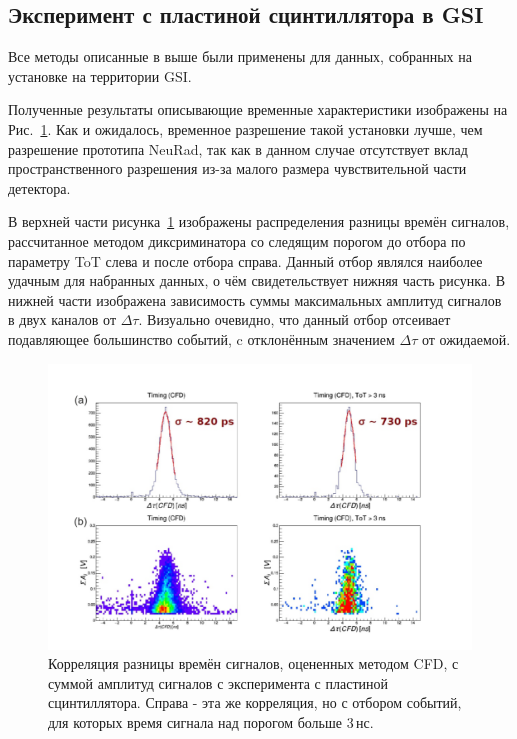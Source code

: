 \subsection{Эксперимент с пластиной сцинтиллятора в GSI}

Все методы описанные в выше были применены для данных, собранных на установке на территории GSI.

Полученные результаты описывающие временные характеристики изображены на Рис.~\ref{ris:GSIcfd_amp}. Как и ожидалось, временное разрешение такой установки лучше, чем разрешение прототипа NeuRad, так как в данном случае отсутствует вклад пространственного разрешения из-за малого размера чувствительной части детектора.

В верхней части рисунка~\ref{ris:GSIcfd_amp} изображены распределения разницы времён сигналов, рассчитанное методом диксриминатора со следящим порогом до отбора по параметру ToT слева и после отбора справа. Данный отбор являлся наиболее удачным для набранных данных, о чём свидетельствует нижняя часть рисунка. В нижней части изображена зависимость суммы максимальных амплитуд сигналов в двух каналов от $\Delta\tau$. Визуально очевидно, что данный отбор отсеивает подавляющее большинство событий, c отклонённым значением $\Delta\tau$ от ожидаемой.

\begin{figure}
	\centering
	\includegraphics[width=1\linewidth]{CFD_amp.png}
	\caption{Корреляция разницы времён сигналов, оцененных методом CFD, с суммой амплитуд сигналов с эксперимента с пластиной сцинтиллятора. Справа - эта же корреляция, но с отбором событий, для которых время сигнала над порогом больше 3\,нс.}
	\label{ris:GSIcfd_amp}
\end{figure}

